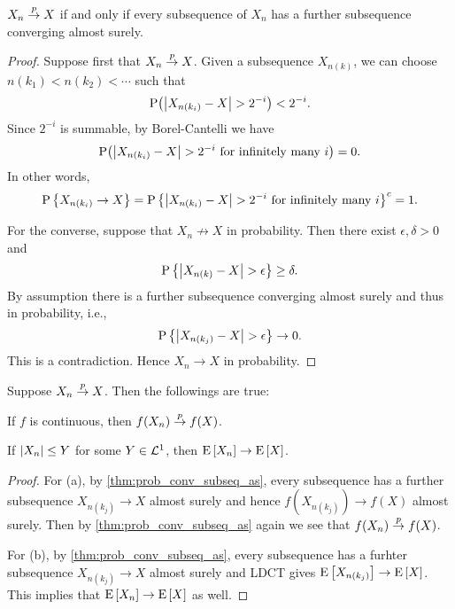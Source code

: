 \begin{theorem}\label{thm:prob_conv_subseq_as}
    $X_n\overset{p}{\to} X$ if and only if every subsequence of $X_n$ has a further subsequence 
    converging almost surely. 
\end{theorem}
\begin{proof}
    Suppose first that $X_n\overset{p}{\to} X$. Given a subsequence $X_{n(k)}$, we can 
    choose $n(k_1)<n(k_2)<\cdots$ such that 
    \begin{equation*}
        \P\pth{\abs{X_{n(k_i)}-X}>2^{-i}} < 2^{-i}. 
    \end{equation*} 
    Since $2^{-i}$ is summable, by Borel-Cantelli we have 
    \begin{equation*}
        \P\pth{\abs{X_{n(k_i)}-X}>2^{-i}\text{ for infinitely many $i$}} = 0. 
    \end{equation*}
    In other words, 
    \begin{equation*}
        \operatorname{P}\left\{ {X_{n(k_i)}\to X} \right\} = \operatorname{P}\left\{ {\left\lvert {X_{n(k_i)}-X} \right\rvert>2^{-i}\text{ for infinitely many $i$}} \right\}^c 
        = 1. 
    \end{equation*}

    For the converse, suppose that $X_n\not\to X$ in probability. Then there exist 
    $\epsilon, \delta>0$ and 
    \begin{equation*}
        \operatorname{P}\left\{ {\left\lvert {X_{n(k)} - X} \right\rvert>\epsilon} \right\} \geq \delta. 
    \end{equation*}
    By assumption there is a further subsequence converging almost surely 
    and thus in probability, i.e., 
    \begin{equation*}
        \operatorname{P}\left\{ {\left\lvert {X_{n(k_j)} - X} \right\rvert>\epsilon} \right\} \to 0.
    \end{equation*}
    This is a contradiction. Hence $X_n\to X$ in probability. 
\end{proof}

\begin{corollary}
    Suppose $X_n\overset{p}{\to} X$. Then the followings are true: 
    \begin{thmenum}
        \item If $f$ is continuous, then $f(X_n)\overset{p}{\to} f(X)$. 
        \item If $\left\lvert {X_n} \right\rvert\leq Y$ for some $Y\in\mathcal{L}^1$, then $\operatorname{E}\left[ {X_n} \right]\to\operatorname{E}\left[ {X} \right]$. 
    \end{thmenum}
\end{corollary}
\begin{proof}
    For (a), by \cref{thm:prob_conv_subseq_as}, every subsequence 
    has a further subsequence $X_{n(k_j)}\to X$ almost surely and 
    hence $f(X_{n(k_j)})\to f(X)$ almost surely. Then by \cref{thm:prob_conv_subseq_as} 
    again we see that $f(X_n)\overset{p}{\to} f(X)$. 

    For (b), by \cref{thm:prob_conv_subseq_as}, every subsequence 
    has a furhter subsequence $X_{n(k_j)}\to X$ almost surely and 
    LDCT gives $\operatorname{E}\left[ {X_{n(k_j)}} \right]\to \operatorname{E}\left[ {X} \right]$. This implies 
    that $\operatorname{E}\left[ {X_n} \right]\to \operatorname{E}\left[ {X} \right]$ as well. 
\end{proof}

